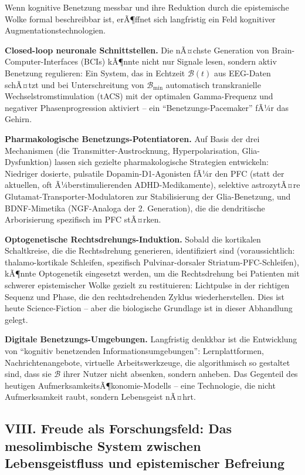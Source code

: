 ﻿\documentclass[12pt,a4paper]{report}
\theoremstyle{plain}
\theoremstyle{definition}
\theoremstyle{remark}
\begin{document}
	Wenn kognitive Benetzung messbar und ihre Reduktion durch die
	epistemische Wolke formal beschreibbar ist, erÃ¶ffnet sich langfristig
	ein Feld kognitiver Augmentationstechnologien.

	\textbf{Closed-loop neuronale Schnittstellen.}
	Die nÃ¤chste Generation von Brain-Computer-Interfaces (BCIs)
	kÃ¶nnte nicht nur Signale lesen, sondern aktiv Benetzung regulieren:
	Ein System, das in Echtzeit $\mathcal{B}(t)$ aus EEG-Daten schÃ¤tzt
	und bei Unterschreitung von $\mathcal{B}_{\min}$ automatisch
	transkranielle Wechselstromstimulation (tACS) mit der optimalen
	Gamma-Frequenz und negativer Phasenprogression aktiviert --
	ein ``Benetzungs-Pacemaker'' fÃ¼r das Gehirn.

	\textbf{Pharmakologische Benetzungs-Potentiatoren.}
	Auf Basis der drei Mechanismen (die Trans\-mitter-Austrocknung,
	Hyperpolarisation, Glia-Dysfunktion) lassen sich gezielte
	pharmakologische Strategien entwickeln:
	Niedriger dosierte, pulsatile Dopamin-D1-Agonisten fÃ¼r den PFC
	(statt der aktuellen, oft Ã¼berstimulierenden ADHD-Medikamente),
	selektive astrozytÃ¤re Glutamat-Transporter-Modulatoren
	zur Stabilisierung der Glia-Benetzung, und
	BDNF-Mimetika (NGF-Analoga der 2. Generation), die die
	dendritische Arborisierung spezifisch im PFC stÃ¤rken.

	\textbf{Optogenetische Rechtsdrehungs-Induktion.}
	Sobald die kortikalen Schaltkreise, die die Rechtsdrehung generieren,
	identifiziert sind (voraussichtlich: thalamo-kortikale Schleifen,
	spezifisch Pulvinar-dorsaler Striatum-PFC-Schleifen),
	kÃ¶nnte Optogenetik eingesetzt werden, um die Rechtsdrehung
	bei Patienten mit schwerer epistemischer Wolke gezielt zu
	restituieren: Lichtpulse in der richtigen Sequenz und Phase,
	die den rechtsdrehenden Zyklus wiederherstellen.
	Dies ist heute Science-Fiction -- aber die biologische Grundlage
	ist in dieser Abhandlung gelegt.

	\textbf{Digitale Benetzungs-Umgebungen.}
	Langfristig denkkbar ist die Entwicklung von ``kognitiv benetzenden
	Informationsumgebungen'': Lernplattformen, Nachrichtenangebote,
	virtuelle Arbeitswerkzeuge, die algorithmisch so gestaltet sind,
	dass sie $\mathcal{B}$ ihrer Nutzer nicht absenken, sondern anheben.
	Das Gegenteil des heutigen AufmerksamkeitsÃ¶konomie-Modells --
	eine Technologie, die nicht Aufmerksamkeit raubt, sondern
	Lebensgeist nÃ¤hrt.

	\subsection*{VIII. Freude als Forschungsfeld: Das mesolimbische System
		zwischen Lebensgeistfluss und epistemischer Befreiung}
\end{document}
